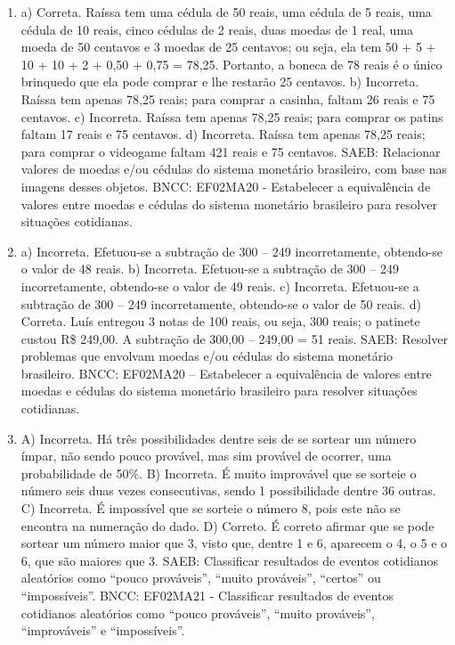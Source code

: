 \begin{enumerate}
\item
a) Correta. Raíssa tem uma cédula de 50 reais, uma cédula de 5 reais,
uma cédula de 10 reais, cinco cédulas de 2 reais, duas moedas de 1 real,
uma moeda de 50 centavos e 3 moedas de 25 centavos; ou seja, ela tem 50
+ 5 + 10 + 10 + 2 + 0,50 + 0,75 = 78,25. Portanto, a boneca de 78 reais
é o único brinquedo que ela pode comprar e lhe restarão 25 centavos.
b) Incorreta. Raíssa tem apenas 78,25 reais; para comprar a casinha,
faltam 26 reais e 75 centavos.
c) Incorreta. Raíssa tem apenas 78,25 reais; para comprar os patins
faltam 17 reais e 75 centavos.
d) Incorreta. Raíssa tem apenas 78,25 reais; para comprar o videogame
faltam 421 reais e 75 centavos.
SAEB: Relacionar valores de moedas e/ou cédulas do sistema
monetário brasileiro, com base nas imagens desses objetos.
BNCC: EF02MA20 - Estabelecer a equivalência de valores entre moedas e
cédulas do sistema monetário brasileiro para resolver situações
cotidianas.

\item
a) Incorreta. Efetuou-se a subtração de 300 -- 249 incorretamente, obtendo-se o valor de 48 reais.
b) Incorreta. Efetuou-se a subtração de 300 -- 249 incorretamente, obtendo-se o valor de 49 reais.
c) Incorreta. Efetuou-se a subtração de 300 -- 249 incorretamente, obtendo-se o valor de 50 reais.
d) Correta. Luís entregou 3 notas de 100 reais, ou seja, 300 reais; o patinete custou R\$ 249,00. A subtração de 300,00 -- 249,00 = 51 reais.
SAEB: Resolver problemas que envolvam moedas e/ou cédulas do
sistema monetário brasileiro. 
BNCC: EF02MA20 -- Estabelecer a
equivalência de valores entre moedas e cédulas do sistema monetário
brasileiro para resolver situações cotidianas.

\item
A) Incorreta. Há três possibilidades dentre seis de se sortear um número
ímpar, não sendo pouco provável, mas sim provável de ocorrer, uma
probabilidade de 50\%.
B) Incorreta. É muito improvável que se sorteie o número seis duas vezes
consecutivas, sendo 1 possibilidade dentre 36 outras.
C) Incorreta. É impossível que se sorteie o número 8, pois este não se
encontra na numeração do dado.
D) Correto. É correto afirmar que se pode sortear um número maior que 3,
visto que, dentre 1 e 6, aparecem o 4, o 5 e o 6, que são maiores que 3.
SAEB: Classificar resultados de eventos cotidianos aleatórios
como ``pouco prováveis'', ``muito prováveis'', ``certos'' ou
``impossíveis''.
BNCC: EF02MA21 - Classificar resultados de eventos cotidianos aleatórios
como ``pouco prováveis'', ``muito prováveis'', ``improváveis'' e
``impossíveis''.


\end{enumerate}
